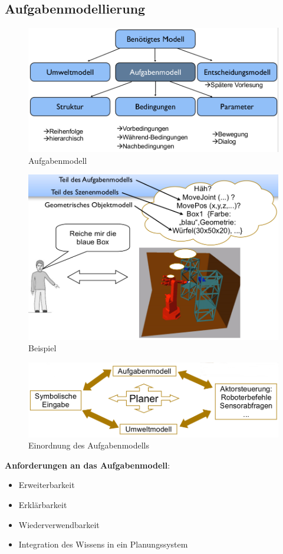 \subsection{Aufgabenmodellierung}
\begin{figure}[h!]\centering 
\includegraphics[width=0.6\linewidth]{figures/ch02_aufgabenmodell.png}
\caption{Aufgabenmodell}
\label{fig:ch02_am}
\end{figure}
\begin{figure}[ht]\centering 
\includegraphics[width=0.6\linewidth]{figures/ch02_beispiel.png}
\caption{Beispiel}
\label{fig:ch02_bsp}
\end{figure}
\begin{figure}[h!]\centering 
\includegraphics[width=0.6\linewidth]{figures/ch02_planer.png}
\caption{Einordnung des Aufgabenmodells}
\label{fig:ch02_ord}
\end{figure}
\textbf{Anforderungen an das Aufgabenmodell}:
\begin{itemize}
\item Erweiterbarkeit
\item Erklärbarkeit
\item Wiederverwendbarkeit
\item Integration des Wissens in ein Planungssystem
\end{itemize}
